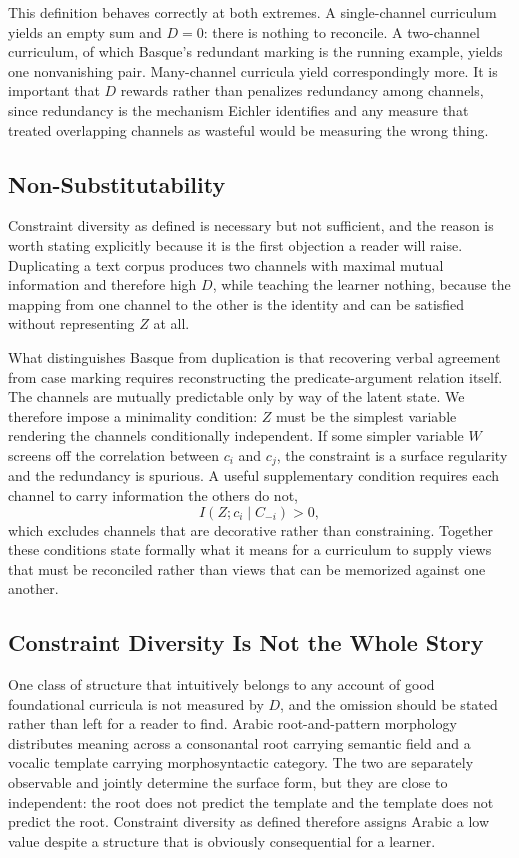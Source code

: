 \documentclass[11pt]{article}
\begin{document}
This definition behaves correctly at both extremes. A single-channel curriculum yields an empty sum and $D=0$: there is nothing to reconcile. A two-channel curriculum, of which Basque's redundant marking is the running example, yields one nonvanishing pair. Many-channel curricula yield correspondingly more. It is important that $D$ rewards rather than penalizes redundancy among channels, since redundancy is the mechanism Eichler identifies and any measure that treated overlapping channels as wasteful would be measuring the wrong thing.

\subsection{Non-Substitutability}

Constraint diversity as defined is necessary but not sufficient, and the reason is worth stating explicitly because it is the first objection a reader will raise. Duplicating a text corpus produces two channels with maximal mutual information and therefore high $D$, while teaching the learner nothing, because the mapping from one channel to the other is the identity and can be satisfied without representing $Z$ at all.

What distinguishes Basque from duplication is that recovering verbal agreement from case marking requires reconstructing the predicate-argument relation itself. The channels are mutually predictable only by way of the latent state. We therefore impose a minimality condition: $Z$ must be the simplest variable rendering the channels conditionally independent. If some simpler variable $W$ screens off the correlation between $c_i$ and $c_j$, the constraint is a surface regularity and the redundancy is spurious. A useful supplementary condition requires each channel to carry information the others do not,
\[
I(Z;c_i\mid C_{-i})>0,
\]
which excludes channels that are decorative rather than constraining. Together these conditions state formally what it means for a curriculum to supply views that must be reconciled rather than views that can be memorized against one another.

\subsection{Constraint Diversity Is Not the Whole Story}

One class of structure that intuitively belongs to any account of good foundational curricula is not measured by $D$, and the omission should be stated rather than left for a reader to find. Arabic root-and-pattern morphology distributes meaning across a consonantal root carrying semantic field and a vocalic template carrying morphosyntactic category. The two are separately observable and jointly determine the surface form, but they are close to independent: the root does not predict the template and the template does not predict the root. Constraint diversity as defined therefore assigns Arabic a low value despite a structure that is obviously consequential for a learner.
\end{document}
